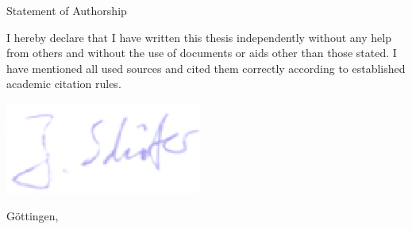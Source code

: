 
\thispagestyle{empty}
\null
\vspace{4cm}
\textnormal{\LARGE Statement of Authorship}\par
\vspace{1cm}
I hereby declare that I have written this thesis independently without any help from others and without the use of documents or aids other than those stated.
I have mentioned all used sources and cited them correctly according to established academic citation rules.

\vspace{1cm}
\includegraphics[scale=0.4]{img/sign.png}

Göttingen, \mysubmissiondate